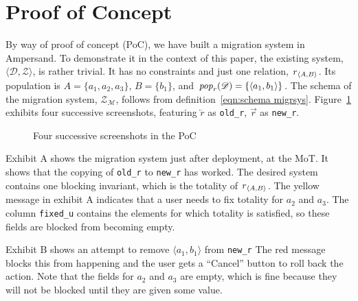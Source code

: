\documentclass[runningheads]{llncs}
\newcommand{\id}[1]{\text{\it #1\/}}
\newcommand{\popF}[1]{\id{pop}_{#1}}
\newcommand{\pop}[2]{\popF{#1}(#2)}
\newcommand{\declare}[3]{\id{#1}_{\pair{#2}{#3}}}
\newcommand{\pair}[2]{\langle{#1},{#2}\rangle}
\newcommand{\dataset}{\mathscr{D}}
\newcommand{\schema}{\mathscr{Z}}
\newcommand{\migrsys}{\mathscr{M}}
\begin{document}
\section{Proof of Concept}
\label{sct:PoC}
   By way of proof of concept (PoC), we have built a migration system in Ampersand.
   To demonstrate it in the context of this paper, the existing system, $\pair{\dataset}{\schema}$, is rather trivial.
   It has no constraints and just one relation, $\declare{r}{A}{B}$.
   Its population is $A=\{a_1,a_2,a_3\}$, $B=\{b_1\}$, and $\pop{r}{\dataset}=\{\pair{a_1}{b_1}\}$.
   The schema of the migration system, $\schema_\migrsys$, follows from definition~\ref{eqn:schema migrsys}.
   Figure~\ref{fig:PoC} exhibits four successive screenshots,
   featuring $\overleftarrow{r}$ as {\small\verb#old_r#},
   $\overrightarrow{r}$ as {\small\verb#new_r#}.
\begin{figure}[bht]
   \begin{center}
   \end{center}
\caption{Four successive screenshots in the PoC}
\label{fig:PoC}
\end{figure}

   Exhibit A shows the migration system just after deployment, at the MoT.
   It shows that the copying of {\small\verb#old_r#} to {\small\verb#new_r#} has worked.
   The desired system contains one blocking invariant, which is the totality of $\declare{r}{A}{B}$.
   The yellow message in exhibit A indicates that a user needs to fix totality for $a_2$ and $a_3$.
   The column {\small\verb#fixed_u#} contains the elements for which totality is satisfied, so these fields are blocked from becoming empty.

   Exhibit B shows an attempt to remove $\pair{a_1}{b_1}$ from {\small\verb#new_r#}
   The red message blocks this from happening and the user gets a ``Cancel'' button to roll back the action.
   Note that the fields for $a_2$ and $a_3$ are empty, which is fine because they will not be blocked until they are given some value.
\end{document}
